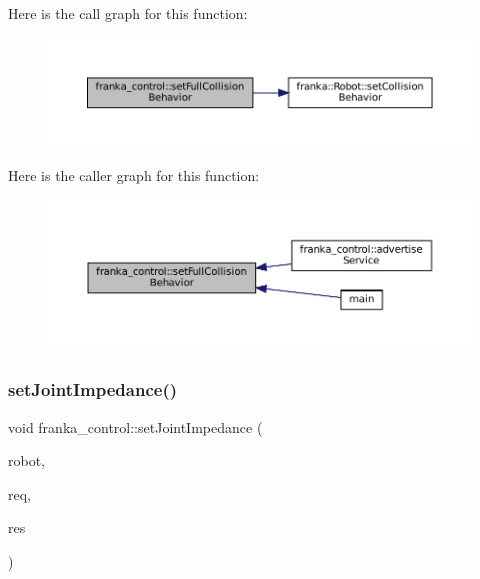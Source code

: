 Here is the call graph for this function\+:
\nopagebreak
\begin{figure}[H]
\begin{center}
\leavevmode
\includegraphics[width=350pt]{namespacefranka__control_a13e02b7048c013bf57506f927ce6745d_cgraph}
\end{center}
\end{figure}
Here is the caller graph for this function\+:
\nopagebreak
\begin{figure}[H]
\begin{center}
\leavevmode
\includegraphics[width=350pt]{namespacefranka__control_a13e02b7048c013bf57506f927ce6745d_icgraph}
\end{center}
\end{figure}
\mbox{\label{namespacefranka__control_a38bda5f02b38367b199e8599993994ca}} 
\subsubsection{\texorpdfstring{set\+Joint\+Impedance()}{setJointImpedance()}}
{\footnotesize\ttfamily void franka\+\_\+control\+::set\+Joint\+Impedance (\begin{DoxyParamCaption}\item[{\hyperlink{classfranka_1_1Robot}{franka\+::\+Robot} \&}]{robot,  }\item[{const Set\+Joint\+Impedance\+::\+Request \&}]{req,  }\item[{Set\+Joint\+Impedance\+::\+Response \&}]{res }\end{DoxyParamCaption})}



